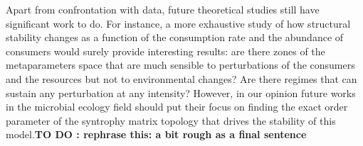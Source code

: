 \documentclass[12pt, titlepage]{report}
\begin{document}
Apart from confrontation with data, future theoretical studies still have significant work to do. For instance, a more exhaustive study of how structural stability changes as a function of the consumption rate and the abundance of consumers would surely provide interesting results: are there zones of the metaparameters space that are much sensible to perturbations of the consumers and the resources but not to environmental changes? Are there regimes that can sustain any perturbation at any intensity?
However, in our opinion future works in the microbial ecology field should put their focus on finding the exact order parameter of the syntrophy matrix topology that drives the stability of this model.\textbf{TO DO : rephrase this: a bit rough as a final sentence}  

%
\end{document}
